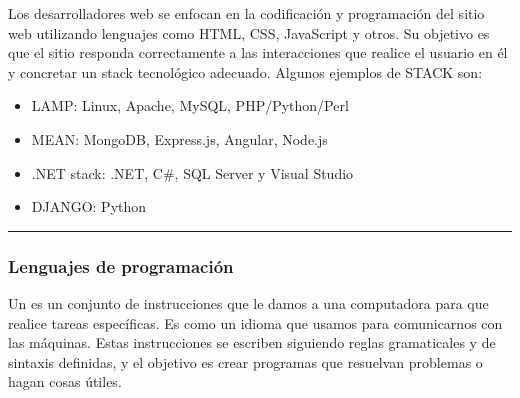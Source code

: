 \documentclass[letterpaper,10pt,spanish]{sphinxmanual}
\begin{document}
\sphinxAtStartPar
Los desarrolladores web se enfocan en la codificación y programación del sitio web utilizando lenguajes como HTML, CSS, JavaScript y otros. Su objetivo es que el sitio responda correctamente a las interacciones que realice el usuario en él y concretar un stack tecnológico adecuado. Algunos ejemplos de STACK son:
\begin{itemize}
\item {} 
\sphinxAtStartPar
LAMP: Linux, Apache, MySQL, PHP/Python/Perl

\item {} 
\sphinxAtStartPar
MEAN: MongoDB, Express.js, Angular, Node.js

\item {} 
\sphinxAtStartPar
.NET stack: .NET, C\#, SQL Server y Visual Studio

\item {} 
\sphinxAtStartPar
DJANGO: Python

\end{itemize}


\bigskip\hrule\bigskip



\subsubsection{Lenguajes de programación}
\label{\detokenize{1_guias/10programacion/G1021:lenguajes-de-programacion}}
\sphinxAtStartPar
Un  es un conjunto de instrucciones que le damos a una computadora para que realice tareas específicas. Es como un idioma que usamos para comunicarnos con las máquinas. Estas instrucciones se escriben siguiendo reglas gramaticales y de sintaxis definidas, y el objetivo es crear programas que resuelvan problemas o hagan cosas útiles.
\end{document}

